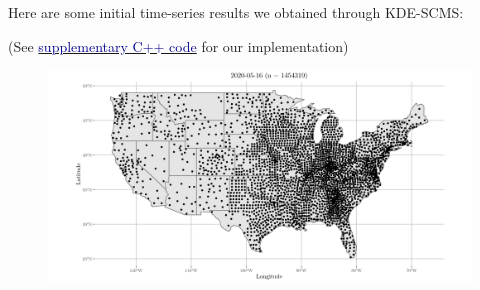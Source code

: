 \documentclass[letterpaper,fleqn]{article}
\theoremstyle{plain}
\theoremstyle{definition}
\newcommand{\1}{\mathds{1}}
\begin{document}
Here are some initial time-series results we obtained through KDE-SCMS:

\vspace{-1em}
\begin{figure}[!htb]
\end{figure}
\vspace{-1em}
(See \href{https://github.com/davidlieberman/AMATH797/tree/master/Project}{\textcolor{darkblue}{supplementary C++ code}} for our implementation)

\newpage

\begin{figure}[!htb]
\includegraphics[width=\textwidth]{millions.png}
\end{figure}
\end{document}
